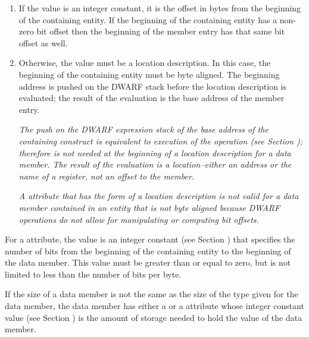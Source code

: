 \begin{enumerate}[1.]

\item If the value is an integer constant, it is the offset
in bytes from the beginning of the containing entity. If
the beginning of the containing entity has a non-zero bit
offset then the beginning of the member entry has that same
bit offset as well.

\item Otherwise, the value must be a location description. In
this case, the beginning of the containing entity must be byte
aligned. The beginning address is pushed on the DWARF stack
before the location description is evaluated; the result of
the evaluation is the base address of the member entry.

\textit{The push on the DWARF expression stack of the base address of
the containing construct is equivalent to execution of the
 operation 
(see Section );
 therefore is not needed at the
beginning of a location description for a data member. The
result of the evaluation is a location--either an address or
the name of a register, not an offset to the member.}

\textit{A  attribute that has the form of a
location description is not valid for a data member contained
in an entity that is not byte aligned because DWARF operations
do not allow for manipulating or computing bit offsets.}

\end{enumerate}

For a  attribute, the value is an integer
constant 
(see Section ) 
that specifies the number of bits
from the beginning of the containing entity to the beginning
of the data member. This value must be greater than or equal
to zero, but is not limited to less than the number of bits
per byte.

If the size of a data member is not the same as the size
of the type given for the data member, the data member has
either a  or a  attribute whose
integer constant value 
(see Section ) 
is the amount
of storage needed to hold the value of the data member.

